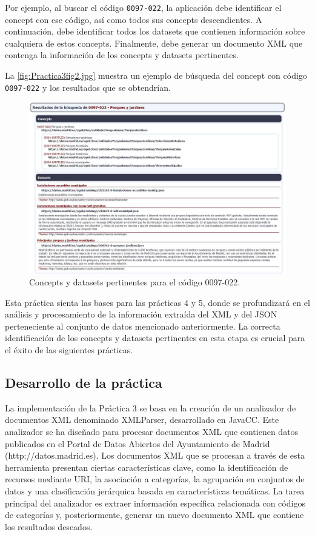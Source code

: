 Por ejemplo, al buscar el código \lstinline|0097-022|, la aplicación debe identificar el concept con ese código, así como todos sus concepts descendientes. A continuación, debe identificar todos los datasets que contienen información sobre cualquiera de estos concepts. Finalmente, debe generar un documento XML que contenga la información de los concepts y datasets pertinentes.

La \autoref{fig:Practica3fig2.jpg} muestra un ejemplo de búsqueda del concept con código \lstinline|0097-022| y los resultados que se obtendrían.

\begin{figure}[H]
    \centering
    \includegraphics[width=\textwidth]{imagenes/Practica3fig2.jpg}
    \caption{Concepts y datasets pertinentes para el código 0097-022.}
    \label{fig:Practica3fig2.jpg}
\end{figure}

Esta práctica sienta las bases para las prácticas 4 y 5, donde se profundizará en el análisis y procesamiento de la información extraída del XML y del JSON perteneciente al conjunto de datos mencionado anteriormente. La correcta identificación de los concepts y datasets pertinentes en esta etapa es crucial para el éxito de las siguientes prácticas.

\subsection{Desarrollo de la práctica}

\noindent La implementación de la Práctica 3 se basa en la creación de un analizador de documentos XML denominado XMLParser, desarrollado en JavaCC. Este analizador se ha diseñado para procesar documentos XML que contienen datos publicados en el Portal de Datos Abiertos del Ayuntamiento de Madrid (http://datos.madrid.es).
Los documentos XML que se procesan a través de esta herramienta presentan ciertas características clave, como la identificación de recursos mediante URI, la asociación a categorías, la agrupación en conjuntos de datos y una clasificación jerárquica basada en características temáticas. La tarea principal del analizador es extraer información específica relacionada con códigos de categorías y, posteriormente, generar un nuevo documento XML que contiene los resultados deseados.


